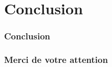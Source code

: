 \documentclass[10pt,fleqn]{beamer}
\begin{document}
\section[]{}
\subsection[]{ }
\begin{frame}
\frametitle{}
\end{frame}

\subsection[]{ }
\begin{frame}
\frametitle{}
\end{frame}

\section[Conclusion]{Conclusion}
\begin{frame}
\frametitle{Conclusion}
\end{frame}

\begin{frame}
\frametitle{Merci de votre attention}
\end{frame}
\end{document}
